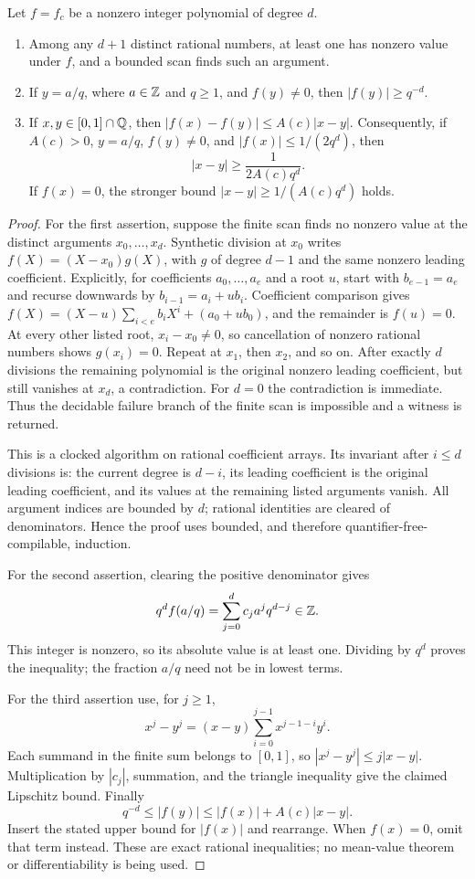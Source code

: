 \begin{theorem}
\label{tr:polynomial}
Let $f=f_c$ be a nonzero integer polynomial of degree $d$.
\begin{enumerate}
\item Among any $d+1$ distinct rational numbers, at least one has
nonzero value under $f$, and a bounded scan finds such an argument.
\item If $y=a/q$, where $a\in\mathbb Z$ and $q\ge1$, and $f(y)\ne0$, then
$|f(y)|\ge q^{-d}$.
\item If $x,y\in[0,1]\cap\mathbb Q$, then
$|f(x)-f(y)|\le A(c)|x-y|$. Consequently, if $A(c)>0$,
$y=a/q$, $f(y)\ne0$, and $|f(x)|\le1/(2q^d)$, then
\[
 |x-y|\ge\frac1{2A(c)q^d}.
\]
If $f(x)=0$, the stronger bound $|x-y|\ge1/(A(c)q^d)$ holds.
\end{enumerate}
\end{theorem}
\begin{proof}
For the first assertion, suppose the finite scan finds no nonzero
value at the distinct arguments $x_0,\ldots,x_d$. Synthetic division
at $x_0$ writes $f(X)=(X-x_0)g(X)$, with $g$ of degree $d-1$
and the same nonzero leading coefficient. Explicitly, for coefficients
$a_0,\ldots,a_e$ and a root $u$, start with $b_{e-1}=a_e$ and
recurse downwards by $b_{i-1}=a_i+ub_i$. Coefficient comparison gives
$f(X)=(X-u)\sum_{i<e}b_iX^i+(a_0+ub_0)$, and the remainder
is $f(u)=0$. At every other listed root,
$x_i-x_0\ne0$, so cancellation of nonzero rational numbers shows
$g(x_i)=0$. Repeat at $x_1$, then $x_2$, and so on. After exactly
$d$ divisions the remaining polynomial is the original nonzero leading
coefficient, but still vanishes at $x_d$, a contradiction. For $d=0$
the contradiction is immediate. Thus the decidable failure branch of
the finite scan is impossible and a witness is returned.

This is a clocked algorithm on rational coefficient arrays. Its invariant
after $i\le d$ divisions is: the current degree is $d-i$, its leading
coefficient is the original leading coefficient, and its values at the
remaining listed arguments vanish. All argument indices are bounded by
$d$; rational identities are cleared of denominators. Hence the proof
uses bounded, and therefore quantifier-free-compilable, induction.

For the second assertion, clearing the positive denominator gives
\[
 q^d f(a/q)=\sum_{j=0}^d c_j a^j q^{d-j}\in\mathbb Z.
\]
This integer is nonzero, so its absolute value is at least one.
Dividing by $q^d$ proves the inequality; the fraction $a/q$ need not
be in lowest terms.

For the third assertion use, for $j\ge1$,
\[
 x^j-y^j=(x-y)\sum_{i=0}^{j-1}x^{j-1-i}y^i.
\]
Each summand in the finite sum belongs to $[0,1]$, so
$|x^j-y^j|\le j|x-y|$. Multiplication by $|c_j|$, summation,
and the triangle inequality give the claimed Lipschitz bound. Finally
\[
 q^{-d}\le |f(y)|\le |f(x)|+A(c)|x-y|.
\]
Insert the stated upper bound for $|f(x)|$ and rearrange. When
$f(x)=0$, omit that term instead. These are exact rational inequalities;
no mean-value theorem or differentiability is being used.
\end{proof}

